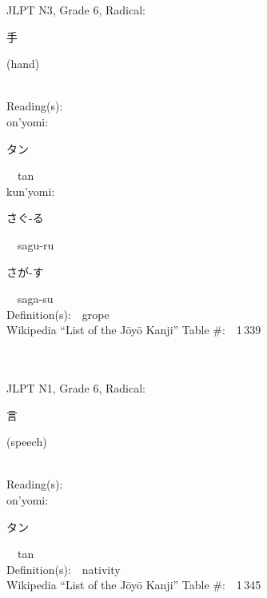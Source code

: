 \begin{multicols}{2}
{JLPT N3, Grade 6, Radical:\ \ {\begin{CJK}{UTF8}{min} 手 \end{CJK}} (hand) } \\
Reading(s):\ \ \\
{\hspace*{1em}}on'yomi:\ \ \\
{\hspace*{2em}}{\begin{CJK}{UTF8}{min} タン \end{CJK}}\ \ tan\ \ \\
{\hspace*{1em}}kun'yomi:\ \ \\
{\hspace*{2em}}{\begin{CJK}{UTF8}{min} さぐ-る \end{CJK}}\ \ sagu-ru\ \ \\
{\hspace*{2em}}{\begin{CJK}{UTF8}{min} さが-す \end{CJK}}\ \ saga-su\ \ \\
Definition(s):\ \ grope \\
Wikipedia ``List of the J\=oy\=o Kanji'' Table \#:\ \ 1\,339 \\
\ \ \\
{\fontsize{34pt}{40pt}  }\ \ \\  %
{JLPT N1, Grade 6, Radical:\ \ {\begin{CJK}{UTF8}{min} 言 \end{CJK}} (speech) } \\
Reading(s):\ \ \\
{\hspace*{1em}}on'yomi:\ \ \\
{\hspace*{2em}}{\begin{CJK}{UTF8}{min} タン \end{CJK}}\ \ tan\ \ \\
Definition(s):\ \ nativity \\
Wikipedia ``List of the J\=oy\=o Kanji'' Table \#:\ \ 1\,345 \\
\ \ \\
{\fontsize{34pt}{40pt}  }\ \ \\  %

\end{multicols}
